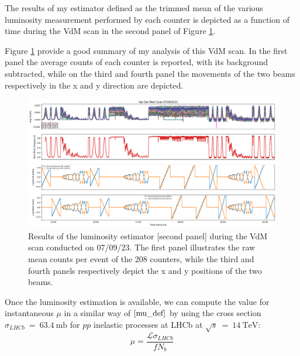 The results of my estimator defined as the trimmed mean of the various luminosity measurement performed by each counter is depicted as a function of time during the VdM scan in the second panel of Figure \ref{fig:lumi_result_all}. 

Figure \ref{fig:lumi_result_all} provide a good summary of my analysis of this VdM scan. In the first panel the average counts of each counter is reported, with its background subtracted, while on the third and fourth panel the movements of the two beams respectively in the x and y direction are depicted.

\begin{figure}
    \centering
    \includegraphics[width=\textwidth]{figures/lumi_plot.png}
    \caption{Results of the luminosity estimator [second panel] during the VdM scan conducted on 07/09/23.
The first panel illustrates the raw mean counts per event of the 208 counters, while the third and fourth
panels respectively depict the x and y positions of the two beams.}
    \label{fig:lumi_result_all}
\end{figure}

Once the luminosity estimation is available, we can compute the value for instantaneous $\mu$ in a similar way of $\eqref{mu_def}$ by using the cross section $\sigma_{LHCb}~=~\SI{63.4}{\milli\barn}$ for $pp$ inelastic processes at LHCb at $\sqrt{s}~=~\SI{14}{\tera\eV}$:
\begin{equation}
    \mu = \frac{\mathcal{L}\sigma_{LHCb}}{f N_b}\label{inst_mu}
\end{equation}




